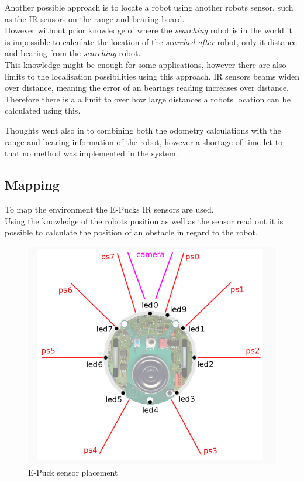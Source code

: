 Another possible approach is to locate a robot using another robots sensor, such as the IR sensors on the range and bearing board. \\
However without prior knowledge of where the \textit{searching} robot is in the world it is impossible to calculate the location of the \textit{searched after} robot, only it distance and bearing from the \textit{searching} robot. \\
This knowledge might be enough for some applications, however there are also limits to the localisation possibilities using this approach.
IR sensors beams widen over distance, meaning the error of an bearings reading increases over distance. Therefore there is a a limit to over how large distances a robots location can be calculated using this. 

Thoughts went also in to combining both the odometry calculations with the range and bearing information of the robot, however a shortage of time let to that no method was implemented in the system. 


\subsection{Mapping}
To map the environment the E-Pucks IR sensors are used. \\
Using the knowledge of the robots position as well as the sensor read out it is possible to calculate the position of an obstacle in regard to the robot. \\

\begin{figure}[h]
\begin{center}
\includegraphics[scale=0.4]{Chapter1/images/e_puck_sensor.png}
\caption{E-Puck sensor placement}
\label{fig:sensor_placement} 
\end{center}
\end{figure}

